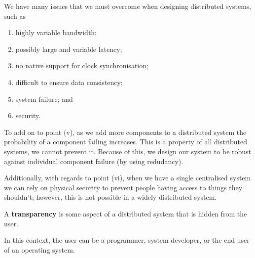 
\begin{remark}
    We have many issues that we must overcome when designing distributed
    systems, such as
    \begin{enumerate}
        \item highly variable bandwidth;
        \item possibly large and variable latency;
        \item no native support for clock synchronisation;
        \item difficult to ensure data consistency;
        \item system failure; and
        \item security.
    \end{enumerate}

    To add on to point (v), as we add more components to a distributed system
    the probability of a component failing increases.
    This is a property of all distributed systems, we cannot prevent it.
    Because of this, we design our system to be robust against individual
    component failure (by using redudancy).

    Additionally, with regards to point (vi), when we have a single centralised
    system we can rely on physical security to prevent people having access
    to things they shouldn't; however, this is not possible in a widely
    distributed system.
\end{remark}

\begin{definition}[Transparency]
    A \textbf{transparency} is some aspect of a distributed system
    that is hidden from the user.
\end{definition}

\begin{remark}
    In this context, the user can be a programmer, system developer,
    or the end user of an operating system.
\end{remark}

